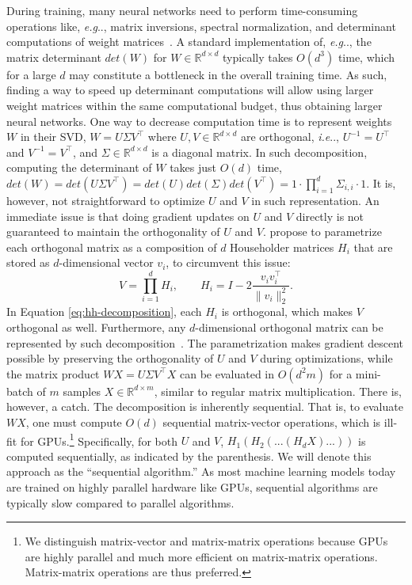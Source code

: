 \documentclass[11pt,a4paper,twoside,openright,final]{memoir}
\makeatletter
\DeclareRobustCommand\onedot{\futurelet\@let@token\@onedot}
\def\@onedot{\ifx\@let@token.\else.\null\fi\xspace}
\def\eg{\emph{e.g}\onedot} \def\Eg{\emph{E.g}\onedot}
\def\ie{\emph{i.e}\onedot} \def\Ie{\emph{I.e}\onedot}
\makeatother
\begin{document}
During training, many neural networks need to perform time-consuming operations like, \eg, matrix inversions, spectral normalization, and determinant computations of weight matrices~\cite{nice, realnvp, glow, sngan}.
A standard implementation of, \eg, the matrix determinant $det(W)$ for $W\in\mathbb{R}^{d\times d}$ typically takes $O(d^3)$ time, which for a large $d$ may constitute a bottleneck in the overall training time. 
As such, finding a way to speed up determinant computations will allow using larger weight matrices within the same computational budget, thus obtaining larger neural networks.
One way to decrease computation time is to represent weights $W$ in their SVD, $W = U\Sigma V^\intercal$ where $U, V \in \mathbb{R}^{d\times d}$ are orthogonal, \ie, $U^{-1} = U^\intercal$ and $V^{-1}= V^\intercal$, and $\Sigma\in \mathbb{R}^{d\times d}$ is a diagonal matrix. 
In such decomposition, computing the determinant of $W$ takes just $O(d)$ time, $det(W) = det(U\Sigma V^\intercal) = det(U)det(\Sigma)det(V^\intercal) = 1\cdot \prod_{i=1}^d \Sigma_{i,i} \cdot 1$.
It is, however, not straightforward to optimize $U$ and $V$ in such representation.
An immediate issue is that doing gradient updates on $U$ and $V$ directly is not guaranteed to maintain the orthogonality of $U$ and $V$.
\citet{sequential} propose to parametrize each orthogonal matrix as a composition of $d$ Householder matrices $H_i$ that are stored as $d$-dimensional vector $v_i$, to circumvent this issue:
\begin{equation}\label{eq:hh-decomposition}
    V = \prod_{i=1}^d H_i, \qquad H_i = I - 2\frac{v_i v_i^\intercal}{\| v_i \|_2^2}.
\end{equation}
In Equation \ref{eq:hh-decomposition}, each $H_i$ is orthogonal, which makes $V$ orthogonal as well. 
Furthermore, any $d$-dimensional orthogonal matrix can be represented by such decomposition~\cite{qrhh}. 
The parametrization makes gradient descent possible by preserving the orthogonality of $U$ and $V$ during optimizations, while the matrix product $WX = U \Sigma V^\intercal X$ can be evaluated in $O(d^2m)$ for a mini-batch of $m$ samples $X\in\mathbb{R}^{d\times m}$, similar to regular matrix multiplication. 
There is, however, a catch.
The decomposition is inherently sequential. 
That is, to evaluate $WX$, one must compute $O(d)$ sequential matrix-vector operations, which is ill-fit for GPUs.\footnote{We distinguish matrix-vector and matrix-matrix operations because GPUs are highly parallel and much more efficient on matrix-matrix operations. Matrix-matrix operations are thus preferred.}
Specifically, for both $U$ and $V$, $H_1(H_2(...(H_dX) ...))$ is computed sequentially, as indicated by the parenthesis.
We will denote this approach as the ``sequential algorithm.'' 
As most machine learning models today are trained on highly parallel hardware like GPUs, sequential algorithms are typically slow compared to parallel algorithms.
\end{document}
